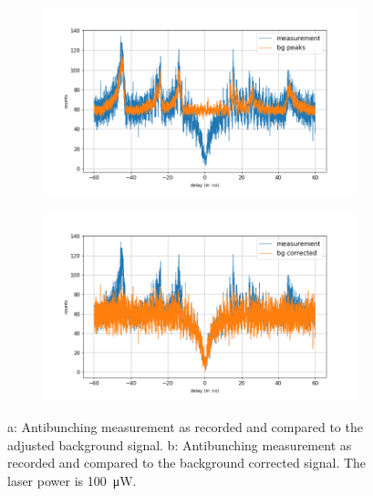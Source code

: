 \begin{figure}[!ht]
    \centering
    \begin{subfigure}{0.47\textwidth}
        \centering
        \includegraphics[width=1.0\textwidth]{img/output_t2/100.0muW_bg_peaks.png}
    \caption{}
    \end{subfigure}
    \begin{subfigure}{0.47\textwidth}
        \centering
        \includegraphics[width=\textwidth]{img/output_t2/100.0muW_bg_vgl.png}
        \caption{}
    \end{subfigure}
    \caption{a: Antibunching measurement as recorded and compared to the adjusted background signal. b: Antibunching measurement as recorded and compared to the background corrected signal. The laser power is \SI{100}{\micro W}.} %
\end{figure}
